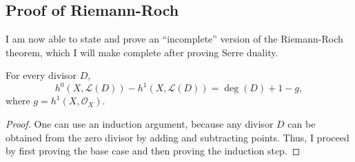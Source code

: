 \subsection{Proof of Riemann-Roch}
I am now able to state and prove an ``incomplete'' version of the
Riemann-Roch theorem, which I will make complete after proving Serre
duality.


\begin{thm}
  \label{thm:riemann_roch_cohomology}
  For every divisor $D$,
  \[
    h^{0}(X, \mathcal{L}(D))-h^{1}(X, \mathcal{L}(D))=\deg(D)+1-g,
  \]
  where $g=h^{1}(X, \mathscr{O}_{X})$.
\end{thm}
\begin{proof}
  One can use an induction argument, because any divisor $D$ can be
  obtained from the zero divisor by adding and subtracting points.
  Thus, I proceed by first proving the base case and then proving
  the induction step.


\end{proof}

